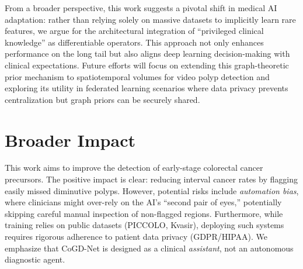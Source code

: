 \documentclass{article}
\begin{document}
From a broader perspective, this work suggests a pivotal shift in medical AI adaptation: rather than relying solely on massive datasets to implicitly learn rare features, we argue for the architectural integration of ``privileged clinical knowledge'' as differentiable operators. This approach not only enhances performance on the long tail but also aligns deep learning decision-making with clinical expectations. Future efforts will focus on extending this graph-theoretic prior mechanism to spatiotemporal volumes for video polyp detection and exploring its utility in federated learning scenarios where data privacy prevents centralization but graph priors can be securely shared.

\section*{Broader Impact}
This work aims to improve the detection of early-stage colorectal cancer precursors. The positive impact is clear: reducing interval cancer rates by flagging easily missed diminutive polyps. However, potential risks include \emph{automation bias}, where clinicians might over-rely on the AI's ``second pair of eyes,'' potentially skipping careful manual inspection of non-flagged regions. Furthermore, while training relies on public datasets (PICCOLO, Kvasir), deploying such systems requires rigorous adherence to patient data privacy (GDPR/HIPAA). We emphasize that CoGD-Net is designed as a clinical \emph{assistant}, not an autonomous diagnostic agent.




\end{document}
